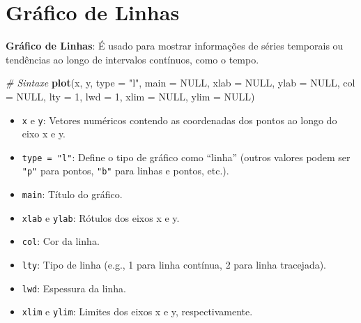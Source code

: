 \documentclass[
]{book}
\newenvironment{Shaded}{\begin{snugshade}}{\end{snugshade}}
\newcommand{\AttributeTok}[1]{\textcolor[rgb]{0.13,0.29,0.53}{#1}}
\newcommand{\CommentTok}[1]{\textcolor[rgb]{0.56,0.35,0.01}{\textit{#1}}}
\newcommand{\ConstantTok}[1]{\textcolor[rgb]{0.56,0.35,0.01}{#1}}
\newcommand{\DecValTok}[1]{\textcolor[rgb]{0.00,0.00,0.81}{#1}}
\newcommand{\FunctionTok}[1]{\textcolor[rgb]{0.13,0.29,0.53}{\textbf{#1}}}
\newcommand{\NormalTok}[1]{#1}
\newcommand{\StringTok}[1]{\textcolor[rgb]{0.31,0.60,0.02}{#1}}
\providecommand{\tightlist}{%
  \setlength{\itemsep}{0pt}\setlength{\parskip}{0pt}}
\begin{document}
\section{Gráfico de Linhas}\label{gruxe1fico-de-linhas}

\textbf{Gráfico de Linhas}: É usado para mostrar informações de séries
temporais ou tendências ao longo de intervalos contínuos, como o tempo.

\begin{Shaded}
\begin{Highlighting}[]
\CommentTok{\# Sintaxe}
\FunctionTok{plot}\NormalTok{(x, y, }
     \AttributeTok{type =} \StringTok{"l"}\NormalTok{, }
     \AttributeTok{main =} \ConstantTok{NULL}\NormalTok{, }
     \AttributeTok{xlab =} \ConstantTok{NULL}\NormalTok{, }
     \AttributeTok{ylab =} \ConstantTok{NULL}\NormalTok{, }
     \AttributeTok{col =} \ConstantTok{NULL}\NormalTok{, }
     \AttributeTok{lty =} \DecValTok{1}\NormalTok{, }
     \AttributeTok{lwd =} \DecValTok{1}\NormalTok{, }
     \AttributeTok{xlim =} \ConstantTok{NULL}\NormalTok{, }
     \AttributeTok{ylim =} \ConstantTok{NULL}\NormalTok{)}
\end{Highlighting}
\end{Shaded}

\begin{itemize}
\tightlist
\item
  \texttt{x} e \texttt{y}: Vetores numéricos contendo as coordenadas dos pontos ao longo do eixo x e y.
\item
  \texttt{type\ =\ "l"}: Define o tipo de gráfico como ``linha'' (outros valores podem ser \texttt{"p"} para pontos, \texttt{"b"} para linhas e pontos, etc.).
\item
  \texttt{main}: Título do gráfico.
\item
  \texttt{xlab} e \texttt{ylab}: Rótulos dos eixos x e y.
\item
  \texttt{col}: Cor da linha.
\item
  \texttt{lty}: Tipo de linha (e.g., 1 para linha contínua, 2 para linha tracejada).
\item
  \texttt{lwd}: Espessura da linha.
\item
  \texttt{xlim} e \texttt{ylim}: Limites dos eixos x e y, respectivamente.
\end{itemize}
\end{document}
